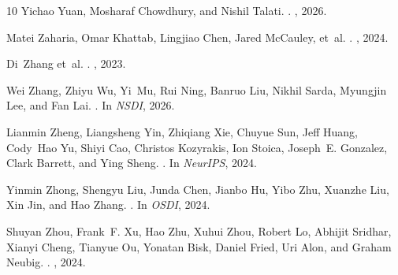 \begin{thebibliography}{10}
Yichao Yuan, Mosharaf Chowdhury, and Nishil Talati.
.
, 2026.

Matei Zaharia, Omar Khattab, Lingjiao Chen, Jared McCauley, et~al.
.
, 2024.

Di~Zhang et~al.
.
, 2023.

Wei Zhang, Zhiyu Wu, Yi~Mu, Rui Ning, Banruo Liu, Nikhil Sarda, Myungjin Lee,
  and Fan Lai.
.
\newblock In {\em NSDI}, 2026.

Lianmin Zheng, Liangsheng Yin, Zhiqiang Xie, Chuyue Sun, Jeff Huang, Cody~Hao
  Yu, Shiyi Cao, Christos Kozyrakis, Ion Stoica, Joseph~E. Gonzalez, Clark
  Barrett, and Ying Sheng.
.
\newblock In {\em NeurIPS}, 2024.

Yinmin Zhong, Shengyu Liu, Junda Chen, Jianbo Hu, Yibo Zhu, Xuanzhe Liu, Xin
  Jin, and Hao Zhang.
.
\newblock In {\em OSDI}, 2024.

Shuyan Zhou, Frank~F. Xu, Hao Zhu, Xuhui Zhou, Robert Lo, Abhijit Sridhar,
  Xianyi Cheng, Tianyue Ou, Yonatan Bisk, Daniel Fried, Uri Alon, and Graham
  Neubig.
.
, 2024.

\end{thebibliography}
